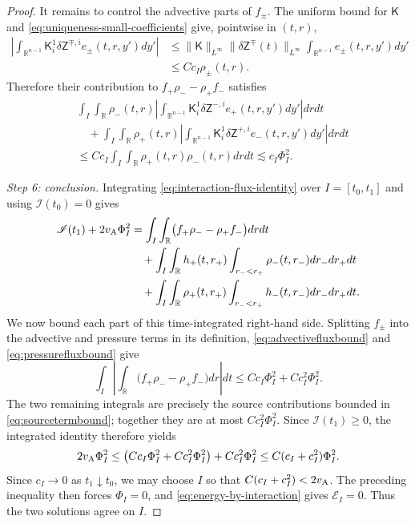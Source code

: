 \documentclass[11pt,reqno]{amsart}
\theoremstyle{plain}
\theoremstyle{definition}
\theoremstyle{remark}
\numberwithin{equation}{section}
\newcommand{\Kmat}{\mathsf K}
\newcommand{\Real}{\mathbb R}
\begin{document}
\begin{proof}
It remains to control the advective parts of $f_\pm$.  The uniform bound
for $\Kmat$ and \eqref{eq:uniqueness-small-coefficients} give, pointwise
in $(t,r)$,
\[
\begin{aligned}
 \left|
 \int_{\Real^{n-1}}
 \Kmat_i^1\delta\mathsf Z^{\mp,i}e_\pm(t,r,y') dy'
 \right|
 &\le
 \|\Kmat\|_{L^\infty}
 \|\delta\mathsf Z^\mp(t)\|_{L^\infty}
 \int_{\Real^{n-1}}e_\pm(t,r,y') dy'\\
 &\le Cc_I\rho_\pm(t,r).
\end{aligned}
\]
Therefore their contribution to
$f_+\rho_--\rho_+f_-$ satisfies
\begin{equation}\label{eq:advectivefluxbound}
\begin{split}
 &\int_I\int_{\Real}
 \rho_-(t,r)
 \left|
 \int_{\Real^{n-1}}
 \Kmat_i^1\delta\mathsf Z^{-,i}e_+(t,r,y') dy'
 \right| dr dt\\
 &\quad+
 \int_I\int_{\Real}
 \rho_+(t,r)
 \left|
 \int_{\Real^{n-1}}
 \Kmat_i^1\delta\mathsf Z^{+,i}e_-(t,r,y') dy'
 \right| dr dt\\
 &\le
 Cc_I\int_I\int_{\Real}\rho_+(t,r)\rho_-(t,r) dr dt
 \lesssim c_I\Phi_I^2.   
\end{split}
\end{equation}

\emph{Step 6: conclusion.}  Integrating
\eqref{eq:interaction-flux-identity} over $I=[t_0,t_1]$ and using
$\mathscr I(t_0)=0$ gives
\[
\begin{aligned}
 \mathscr I(t_1)+2v_{\rm A}\Phi_I^2
 &=\int_I\int_{\Real}
   \bigl(f_+\rho_--\rho_+f_-\bigr)drdt\\
 &\quad+
 \int_I\int_{\Real}h_+(t,r_+)
       \int_{r_-<r_+}\rho_-(t,r_-)dr_-dr_+dt\\
 &\quad+
 \int_I\int_{\Real}\rho_+(t,r_+)
       \int_{r_-<r_+}h_-(t,r_-)dr_-dr_+dt.
\end{aligned}
\]
We now bound each part of this time-integrated right-hand side.  Splitting
$f_\pm$ into the advective and pressure terms in its definition,
\eqref{eq:advectivefluxbound} and \eqref{eq:pressurefluxbound} give
\[
 \int_I\left|
 \int_{\Real}\bigl(f_+\rho_--\rho_+f_-\bigr)dr
 \right|dt
 \le Cc_I\Phi_I^2+Cc_I^2\Phi_I^2.
\]
The two remaining integrals are precisely the source contributions bounded
in \eqref{eq:sourcetermbound}; together they are at most
$Cc_I^2\Phi_I^2$.  Since $\mathscr I(t_1)\ge0$, the integrated identity
therefore yields
\[
 2v_{\rm A}\Phi_I^2
 \le
 \bigl(Cc_I\Phi_I^2+Cc_I^2\Phi_I^2\bigr)
 +Cc_I^2\Phi_I^2
 \le C(c_I+c_I^2)\Phi_I^2.
\]
Since $c_I\to0$ as $t_1\downarrow t_0$, we may choose $I$ so that
$C(c_I+c_I^2)<2v_{\rm A}$.  The preceding inequality then forces
$\Phi_I=0$, and \eqref{eq:energy-by-interaction} gives
$\mathcal E_I=0$.  Thus the two solutions agree on $I$.


\end{proof}
\end{document}
